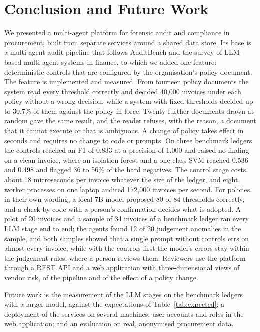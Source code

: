 \documentclass[conference]{IEEEtran}
\begin{document}
\section{Conclusion and Future Work}
We presented a multi-agent platform for forensic audit and compliance in procurement, built from separate services around a shared data store. Its base is a multi-agent audit pipeline that follows AuditBench and the survey of LLM-based multi-agent systems in finance, to which we added one feature: deterministic controls that are configured by the organisation's policy document. The feature is implemented and measured. From fourteen policy documents the system read every threshold correctly and decided 40{,}000 invoices under each policy without a wrong decision, while a system with fixed thresholds decided up to 30.7\% of them against the policy in force. Twenty further documents drawn at random gave the same result, and the reader refuses, with the reason, a document that it cannot execute or that is ambiguous. A change of policy takes effect in seconds and requires no change to code or prompts. On three benchmark ledgers the controls reached an F1 of 0.833 at a precision of 1.000 and raised no finding on a clean invoice, where an isolation forest and a one-class SVM reached 0.536 and 0.498 and flagged 36 to 56\% of the hard negatives. The control stage costs about 18 microseconds per invoice whatever the size of the ledger, and eight worker processes on one laptop audited 172{,}000 invoices per second. For policies in their own wording, a local 7B model proposed 80 of 84 thresholds correctly, and a check by code with a person's confirmation decides what is adopted. A pilot of 20 invoices and a sample of 34 invoices of a benchmark ledger ran every LLM stage end to end; the agents found 12 of 20 judgement anomalies in the sample, and both samples showed that a single prompt without controls errs on almost every invoice, while with the controls first the model's errors stay within the judgement rules, where a person reviews them. Reviewers use the platform through a REST API and a web application with three-dimensional views of vendor risk, of the pipeline and of the effect of a policy change.

Future work is the measurement of the LLM stages on the benchmark ledgers with a larger model, against the expectations of Table~\ref{tab:expected}; a deployment of the services on several machines; user accounts and roles in the web application; and an evaluation on real, anonymised procurement data.
\end{document}
